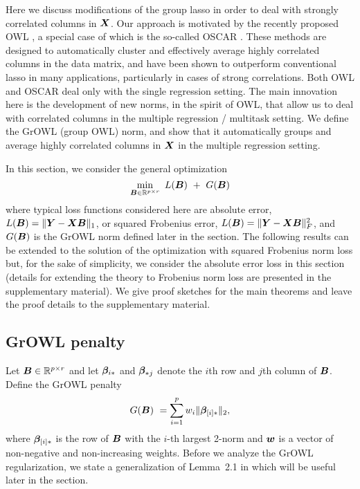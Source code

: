
Here we discuss modifications of the group lasso in order to deal with strongly correlated columns in $\boldsymbol{X}$.  Our approach is motivated by the recently proposed OWL \citep{owl}, a special case of which is the so-called OSCAR \citep{oscar}.  These methods are designed to automatically cluster and effectively average highly correlated columns in the data matrix, and have been shown to outperform conventional lasso in many applications, particularly in cases of strong correlations. Both OWL and OSCAR deal only with the single regression setting. The main innovation here is the development of new norms, in the spirit of OWL, that allow us to deal with correlated columns in the multiple regression / multitask setting. We define the GrOWL (group OWL) norm, and show that it automatically groups and average highly correlated columns in $\boldsymbol{X}$ in the multiple regression setting. 

In this section, we consider the general optimization
\begin{equation}\label{eqn:L1}
\min_{\bB \in \R^{p \times r}} \ L(\bB) \ + \ G(\bB)   
\end{equation}
 where typical loss functions considered here are absolute error, $L(\boldsymbol{B}) = \|\boldsymbol{Y} - \boldsymbol{X} \boldsymbol{B} \|_1$, or squared Frobenius error, $L(\boldsymbol{B}) = \|\boldsymbol{Y} - \boldsymbol{X} \boldsymbol{B} \|_F^2$, and $G(\boldsymbol{B})$ is the GrOWL norm defined later in the section. The following results can be extended to the solution of the optimization with squared Frobenius norm loss but, for the sake of simplicity, we consider the absolute error loss in this section (details for extending the theory to Frobenius norm loss are presented in the supplementary material). We give proof sketches for the main theorems and leave the proof details to the supplementary material.  

\subsection{GrOWL penalty}
Let $\boldsymbol{B} \in {\mathbb R}^{p\times r}$ and let $\boldsymbol{\beta}_{i {\ast}}$ and $\boldsymbol{\beta}_{{\ast}  j}$ denote the $i$th row and $j$th column of $\boldsymbol{B}$.  Define the GrOWL penalty
\begin{equation}\label{Eqn:growl}
G(\bB) \ =  \sum_{i=1}^p w_i \|\bbeta_{[i]\a}\|_2 , 
\end{equation}
where $\boldsymbol{\beta}_{[i]{\ast}}$ is the row of $\boldsymbol{B}$ with the $i$-th largest 2-norm and $\boldsymbol{w}$ is a vector of non-negative and non-increasing weights.
Before we analyze the GrOWL regularization, we state a generalization of Lemma~2.1 in \citep{owl} which will be useful later in the section. 


